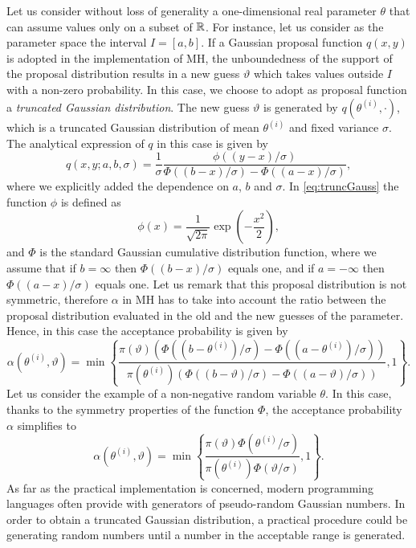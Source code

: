 Let us consider without loss of generality a one-dimensional real parameter $\theta$ that can assume values only on a subset of $\mathbb{R}$. For instance, let us consider as the parameter space the interval $I = [a, b]$. If a Gaussian proposal function $q(x, y)$ is adopted in the implementation of MH, the unboundedness of the support of the proposal distribution results in a new guess $\vartheta$ which takes values outside $I$ with a non-zero probability. In this case, we choose to adopt as proposal function a \textit{truncated Gaussian distribution}. The new guess $\vartheta$ is generated by $q(\theta^{(i)}, \cdot)$, which is a truncated Gaussian distribution of mean $\theta^{(i)}$ and fixed variance $\sigma$. The analytical expression of $q$ in this case is given by
\begin{equation}\label{eq:truncGauss}
	q(x, y; a, b, \sigma) = \frac{1}{\sigma} \frac{\phi\left((y - x)/\sigma\right)}
	{\Phi\left((b - x)/\sigma\right) - \Phi\left((a - x)/\sigma\right)},
\end{equation}
where we explicitly added the dependence on $a$, $b$ and $\sigma$. In \eqref{eq:truncGauss} the function $\phi$ is defined as
\begin{equation}
	\phi(x) = \frac{1}{\sqrt{2\pi}} \exp(-\frac{x^2}{2}),
\end{equation}
and $\Phi$ is the standard Gaussian cumulative distribution function, where we assume that if $b = \infty$ then $\Phi((b-x)/\sigma)$ equals one, and if $a = -\infty$ then $\Phi((a-x)/\sigma)$ equals one. Let us remark that this proposal distribution is not symmetric, therefore $\alpha$ in MH has to take into account the ratio between the proposal distribution evaluated in the old and the new guesses of the parameter. Hence, in this case the acceptance probability is given by
\begin{equation}
		\alpha(\theta^{(i)}, \vartheta) = \min\left\{
		\frac{\pi(\vartheta)\left(\Phi\left((b - \theta^{(i)})/\sigma\right) - \Phi\left((a - \theta^{(i)})/\sigma\right)\right)}
		{\pi(\theta^{(i)})\left(\Phi\left((b - \vartheta)/\sigma\right) - \Phi\left((a - \vartheta)/\sigma\right)\right)}
		, 1\right\}.
\end{equation}
Let us consider the example of a non-negative random variable $\theta$. In this case, thanks to the symmetry properties of the function $\Phi$, the acceptance probability $\alpha$ simplifies to
\begin{equation}
	\alpha(\theta^{(i)}, \vartheta) = \min\left\{
	\frac{\pi(\vartheta)\Phi\left(\theta^{(i)}/\sigma\right)}
	{\pi(\theta^{(i)})\Phi\left(\vartheta/\sigma\right)}
	, 1\right\}.
\end{equation}
As far as the practical implementation is concerned, modern programming languages often provide with generators of pseudo-random Gaussian numbers. In order to obtain a truncated Gaussian distribution, a practical procedure could be generating random numbers until a number in the acceptable range is generated.
